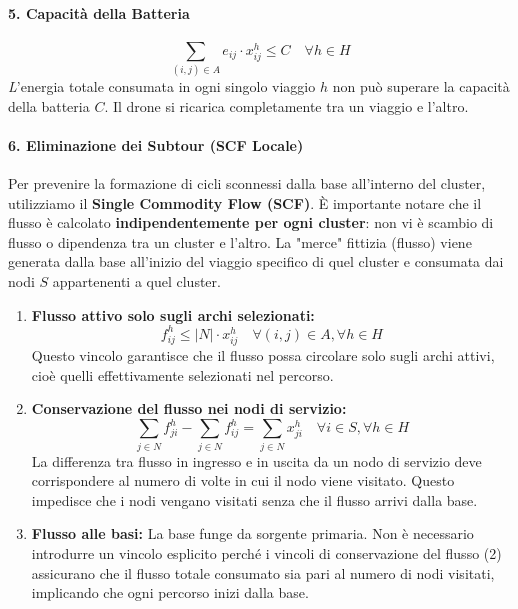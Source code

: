 \documentclass{article}
\begin{document}
\paragraph{5. Capacità della Batteria}
\begin{equation}
    \sum_{(i,j) \in A} e_{ij} \cdot x_{ij}^h \le C \quad \forall h \in H
\end{equation}
\textit   L'energia totale consumata in ogni singolo viaggio $h$ non può superare la capacità della batteria $C$. Il drone si ricarica completamente tra un viaggio e l'altro.

\paragraph{6. Eliminazione dei Subtour (SCF Locale)}

Per prevenire la formazione di cicli sconnessi dalla base all'interno del cluster, utilizziamo il \textbf{Single Commodity Flow (SCF)}.
È importante notare che il flusso è calcolato \textbf{indipendentemente per ogni cluster}: non vi è scambio di flusso o dipendenza tra un cluster e l'altro. La "merce" fittizia (flusso) viene generata dalla base all'inizio del viaggio specifico di quel cluster e consumata dai nodi $S$ appartenenti a quel cluster.




\begin{enumerate}
    \item \textbf{Flusso attivo solo sugli archi selezionati:}
    \begin{equation}
        f_{ij}^h \le |N| \cdot x_{ij}^h \quad \forall (i,j) \in A, \forall h \in H
    \end{equation}
    Questo vincolo garantisce che il flusso possa circolare solo sugli archi attivi, cioè quelli effettivamente selezionati nel percorso.

    \item \textbf{Conservazione del flusso nei nodi di servizio:}
    \begin{equation}
        \sum_{j \in N} f_{ji}^h - \sum_{j \in N} f_{ij}^h = \sum_{j \in N} x_{ji}^h \quad \forall i \in S, \forall h \in H
    \end{equation}
    La differenza tra flusso in ingresso e in uscita da un nodo di servizio deve corrispondere al numero di volte in cui il nodo viene visitato. Questo impedisce che i nodi vengano visitati senza che il flusso arrivi dalla base.

    \item \textbf{Flusso alle basi:}  
    La base funge da sorgente primaria. Non è necessario introdurre un vincolo esplicito perché i vincoli di conservazione del flusso (2) assicurano che il flusso totale consumato sia pari al numero di nodi visitati, implicando che ogni percorso inizi dalla base.
\end{enumerate}
\end{document}
